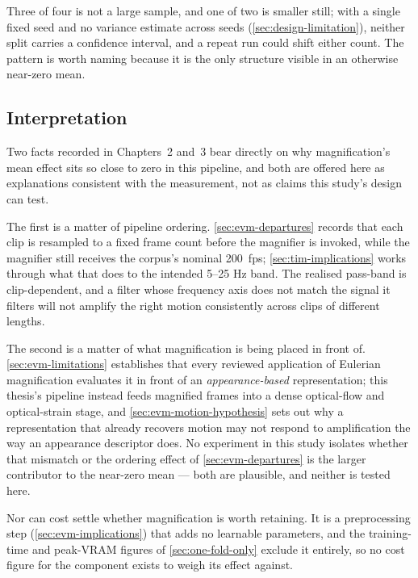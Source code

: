 Three of four is not a large sample, and one of two is smaller still; with a single fixed seed and no variance estimate across seeds (\autoref{sec:design-limitation}), neither split carries a confidence interval, and a repeat run could shift either count. The pattern is worth naming because it is the only structure visible in an otherwise near-zero mean.

\subsection{Interpretation}
\label{sec:evm-interpretation-result}

Two facts recorded in Chapters~2 and~3 bear directly on why magnification's mean effect sits so close to zero in this pipeline, and both are offered here as explanations consistent with the measurement, not as claims this study's design can test.

The first is a matter of pipeline ordering. \autoref{sec:evm-departures} records that each clip is resampled to a fixed frame count before the magnifier is invoked, while the magnifier still receives the corpus's nominal 200~fps; \autoref{sec:tim-implications} works through what that does to the intended 5--25 Hz band. The realised pass-band is clip-dependent, and a filter whose frequency axis does not match the signal it filters will not amplify the right motion consistently across clips of different lengths.

The second is a matter of what magnification is being placed in front of. \autoref{sec:evm-limitations} establishes that every reviewed application of Eulerian magnification evaluates it in front of an \textit{appearance-based} representation; this thesis's pipeline instead feeds magnified frames into a dense optical-flow and optical-strain stage, and \autoref{sec:evm-motion-hypothesis} sets out why a representation that already recovers motion may not respond to amplification the way an appearance descriptor does. No experiment in this study isolates whether that mismatch or the ordering effect of \autoref{sec:evm-departures} is the larger contributor to the near-zero mean --- both are plausible, and neither is tested here.

Nor can cost settle whether magnification is worth retaining. It is a preprocessing step (\autoref{sec:evm-implications}) that adds no learnable parameters, and the training-time and peak-VRAM figures of \autoref{sec:one-fold-only} exclude it entirely, so no cost figure for the component exists to weigh its effect against.


